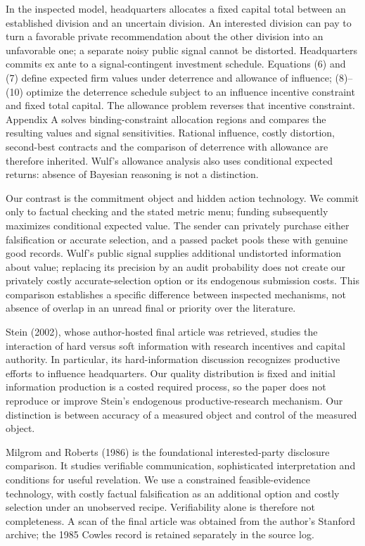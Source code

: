 \documentclass[11pt]{article}
\begin{document}
In the inspected model, headquarters allocates a fixed capital total between an established division and an uncertain division. An interested division can pay to turn a favorable private recommendation about the other division into an unfavorable one; a separate noisy public signal cannot be distorted. Headquarters commits ex ante to a signal-contingent investment schedule. Equations (6) and (7) define expected firm values under deterrence and allowance of influence; (8)--(10) optimize the deterrence schedule subject to an influence incentive constraint and fixed total capital. The allowance problem reverses that incentive constraint. Appendix A solves binding-constraint allocation regions and compares the resulting values and signal sensitivities. Rational influence, costly distortion, second-best contracts and the comparison of deterrence with allowance are therefore inherited. Wulf's allowance analysis also uses conditional expected returns: absence of Bayesian reasoning is not a distinction.

Our contrast is the commitment object and hidden action technology. We commit only to factual checking and the stated metric menu; funding subsequently maximizes conditional expected value. The sender can privately purchase either falsification or accurate selection, and a passed packet pools these with genuine good records. Wulf's public signal supplies additional undistorted information about value; replacing its precision by an audit probability does not create our privately costly accurate-selection option or its endogenous submission costs. This comparison establishes a specific difference between inspected mechanisms, not absence of overlap in an unread final or priority over the literature.

Stein (2002), whose author-hosted final article was retrieved, studies the interaction of hard versus soft information with research incentives and capital authority. In particular, its hard-information discussion recognizes productive efforts to influence headquarters. Our quality distribution is fixed and initial information production is a costed required process, so the paper does not reproduce or improve Stein's endogenous productive-research mechanism. Our distinction is between accuracy of a measured object and control of the measured object.

Milgrom and Roberts (1986) is the foundational interested-party disclosure comparison. It studies verifiable communication, sophisticated interpretation and conditions for useful revelation. We use a constrained feasible-evidence technology, with costly factual falsification as an additional option and costly selection under an unobserved recipe. Verifiability alone is therefore not completeness. A scan of the final article was obtained from the author's Stanford archive; the 1985 Cowles record is retained separately in the source log.
\end{document}

